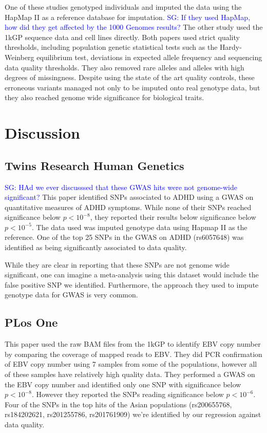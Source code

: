 \documentclass[9pt,lineno]{elife}
\newcommand{\sgcomment}[1]{\textcolor{blue}{SG: #1}}
\begin{document}
One of these studies genotyped individuals and imputed the data using the HapMap II as a reference  database for imputation. \sgcomment{If they used HapMap, how did they get affected by the 1000 Genomes results?}
The other study used the 1kGP sequence data and cell lines directly.
Both papers used strict quality thresholds, including population genetic statistical tests such as the Hardy-Weinberg equilibrium test, deviations in expected allele frequency and sequencing data quality thresholds. 
They also removed rare alleles and alleles with high degrees of missingness. 
Despite using the state of the art quality controls, these erroneous variants managed not only to be imputed onto real genotype data, but they also reached genome wide significance for biological traits.

\section{Discussion}
			
\subsection{Twins Research Human Genetics}
\sgcomment{HAd we ever discusssed that these GWAS hits were not genome-wide significant?}
This paper identified SNPs associated to ADHD using a GWAS on quantitative measures of ADHD symptoms.
While none of their SNPs reached significance below $ p < 10^{-8}$, they reported their results below significance below $ p < 10^{-5}$.
The data used was imputed genotype data using Hapmap II as the reference.
One of the top 25 SNPs in the GWAS on ADHD (rs6057648) was identified as being significantly associated to data quality.\cite{} 

While they are clear in reporting that these SNPs are not genome wide significant, one can imagine a meta-analysis using this dataset would include the false positive SNP we identified. 
Furthermore, the approach they used to impute genotype data for GWAS is very common.

\subsection{PLos One}
This paper used the raw BAM files from the 1kGP to identify EBV copy number by comparing the coverage of mapped reads to EBV.
They did PCR confirmation of EBV copy number using 7 samples from some of the populations, however all of these samples have relatively high quality data.
They performed a GWAS on the EBV copy number and identified only one SNP with significance below $ p < 10^{-8}$. 
However they reported the SNPs reading significance below $ p < 10^{-6}$. 
Four of the SNPs in the top hits of the Asian populations (rs200655768, rs184202621, rs201255786, rs201761909) we're identified by our regression against data quality. \cite{} 
\end{document}
